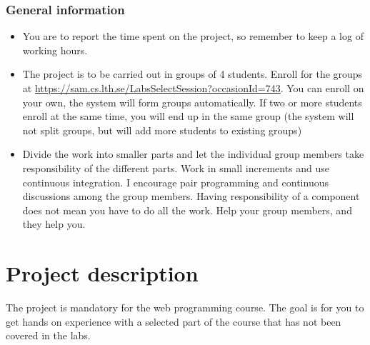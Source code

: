 \documentclass[fleqn, article, a4paper]{memoir}
\begin{document}
\maketitle
\thispagestyle{titlepage}
\vspace{-4cm}

\subsubsection*{General information}

\begin{itemize}\firmlist
\item You are to report the time spent on the project, so remember to keep a log of working hours.
\item The project is to be carried out in groups of 4 students. Enroll for the groups at \url{https://sam.cs.lth.se/LabsSelectSession?occasionId=743}. You can enroll on your own, the system will form groups automatically. If two or more students  enroll at the same time, you will end up in the same group (the system will not split groups, but will add more students to existing groups)
\item Divide the work into smaller parts and let the individual group members take responsibility of the different parts. Work in small increments and use continuous integration. I encourage pair programming and continuous discussions among the group members. Having responsibility of a component does not mean you have to do all the work. Help your group members, and they help you.
\end{itemize}

\section*{Project description}
\n The project is mandatory for the web programming course. The goal is for you to get hands on experience with a selected part of the course that has not been covered in the labs.
\end{document}
